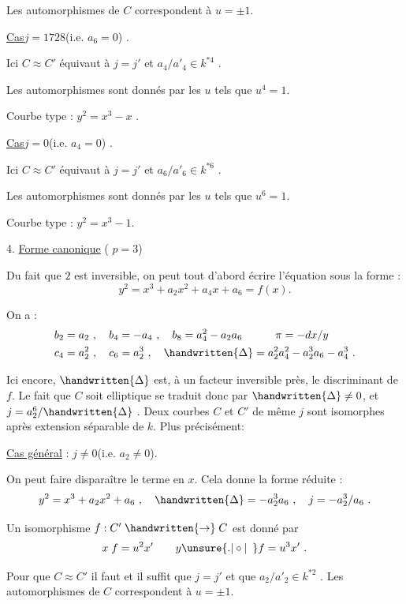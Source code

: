 Les automorphismes de $C$ correspondent à $u=\pm 1$.

\uline{Cas}\quad $j=1728$\quad (i.e. $a_{6}=0$) .

Ici $C\approx C'$ équivaut à $j=j'$ et $a_{4}/a'_{4}\in k^{\ast 4}$ .

Les automorphismes sont donnés par les $u$ tels que $u^{4}=1$.

Courbe type : $y^{2}=x^{3}-x$ .


\uline{Cas}\quad $j=0$\quad (i.e. $a_{4}=0$) .

Ici $C\approx C'$ équivaut à $j=j'$ et $a_{6}/a'_{6}\in k^{\ast 6}$ .

Les automorphismes sont donnés par les $u$ tels que $u^{6}=1$.

Courbe type : $y^{2}=x^{3}-1$.

4. \uline{Forme canonique} ( $p=3$)

Du fait que $2$ est inversible, on peut tout d'abord écrire l'équation sous la forme :
\[
 y^{2}=x^{3}+a_{2}x^{2}+a_{4}x+a_{6}=f(x).
\]

On a :
\[
\begin{aligned}
 &b_{2}=a_{2}\ ,\quad b_{4}=-a_{4}\ ,\quad b_{8}=a_{4}^{2}-a_{2}a_{6}
 \qquad\quad \pi=-dx/y\\
 &c_{4}=a_{2}^{2}\ ,\quad c_{6}=a_{2}^{3}\ ,\quad
 \handwritten{\Delta}=a_{2}^{2}a_{4}^{2}-a_{2}^{3}a_{6}-a_{4}^{3}\ .
\end{aligned}
\]

Ici encore, $\handwritten{\Delta}$ est, à un facteur inversible près, le discriminant de $f$. Le fait que $C$ soit elliptique se traduit donc par $\handwritten{\Delta}\ne 0$, et $j=a_{2}^{6}/\handwritten{\Delta}$ . Deux courbes $C$ et $C'$ de même $j$ sont isomorphes après extension séparable de $k$. Plus précisément:

\uline{Cas général} : $j\ne 0$\quad (i.e. $a_{2}\ne 0$).

On peut faire disparaître le terme en $x$. Cela donne la forme réduite :
\[
 y^{2}=x^{3}+a_{2}x^{2}+a_{6}\ ,\quad
 \handwritten{\Delta}=-a_{2}^{3}a_{6}\ ,\quad j=-a_{2}^{3}/a_{6}\ .
\]

Un isomorphisme $f:C'\mathrel{\handwritten{\to}}C$ est donné par
\[
 x\;f=u^{2}x'\qquad y\unsure{\mathord{.}|\circ|\phantom{\circ}}f=u^{3}x'\ .
\]

Pour que $C\approx C'$ il faut et il suffit que $j=j'$ et que $a_{2}/a'_{2}\in k^{\ast 2}$ . Les automorphismes de $C$ correspondent à $u=\pm 1$.

